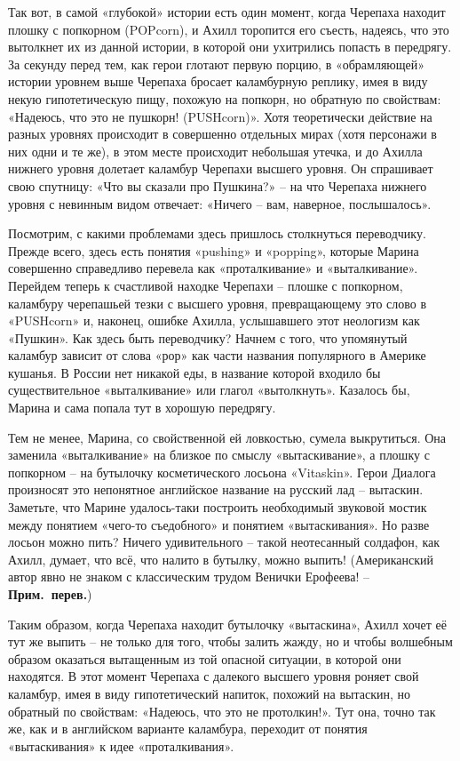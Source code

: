 \documentclass[../main.tex]{subfiles}
\begin{document}
Так вот, в самой «глубокой» истории есть один момент, когда Черепаха находит плошку с попкорном (POPcorn), и Ахилл торопится его съесть, надеясь, что это вытолкнет их из данной истории, в которой они ухитрились попасть в передрягу. За секунду перед тем, как герои глотают первую порцию, в «обрамляющей» истории уровнем выше Черепаха бросает каламбурную реплику, имея в виду некую гипотетическую пищу, похожую на попкорн, но обратную по свойствам: «Надеюсь, что это не пушкорн! (PUSHcorn)». Хотя теоретически действие на разных уровнях происходит в совершенно отдельных мирах (хотя персонажи в них одни и те же), в этом месте происходит небольшая утечка, и до Ахилла нижнего уровня долетает каламбур Черепахи высшего уровня. Он спрашивает свою спутницу: «Что вы сказали про Пушкина?» \--- на что Черепаха нижнего уровня с невинным видом отвечает: «Ничего \--- вам, наверное, послышалось».

Посмотрим, с какими проблемами здесь пришлось столкнуться переводчику. Прежде всего, здесь есть понятия «pushing» и «popping», которые Марина совершенно справедливо перевела как «проталкивание» и «выталкивание». Перейдем теперь к счастливой находке Черепахи \--- плошке с попкорном, каламбуру черепашьей тезки с высшего уровня, превращающему это слово в «PUSHcorn» и, наконец, ошибке Ахилла, услышавшего этот неологизм как «Пушкин». Как здесь быть переводчику? Начнем с того, что упомянутый каламбур зависит от слова «рор» как части названия популярного в Америке кушанья. В России нет никакой еды, в название которой входило бы существительное «выталкивание» или глагол «вытолкнуть». Казалось бы, Марина и сама попала тут в хорошую передрягу.

Тем не менее, Марина, со свойственной ей ловкостью, сумела выкрутиться. Она заменила «выталкивание» на близкое по смыслу «вытаскивание», а плошку с попкорном \--- на бутылочку косметического лосьона «Vitaskin». Герои Диалога произносят это непонятное английское название на русский лад \--- вытаскин. Заметьте, что Марине удалось-таки построить необходимый звуковой мостик между понятием «чего-то съедобного» и понятием «вытаскивания». Но разве лосьон можно пить? Ничего удивительного \--- такой неотесанный солдафон, как Ахилл, думает, что всё, что налито в бутылку, можно выпить! (Американский автор явно не знаком с классическим трудом Венички Ерофеева! \--- \textbf{Прим.\ перев.})

Таким образом, когда Черепаха находит бутылочку «вытаскина», Ахилл хочет её тут же выпить \--- не только для того, чтобы залить жажду, но и чтобы волшебным образом оказаться вытащенным из той опасной ситуации, в которой они находятся. В этот момент Черепаха с далекого высшего уровня роняет свой каламбур, имея в виду гипотетический напиток, похожий на вытаскин, но обратный по свойствам: «Надеюсь, что это не протолкин!». Тут она, точно так же, как и в английском варианте каламбура, переходит от понятия «вытаскивания» к идее «проталкивания».
\end{document}
